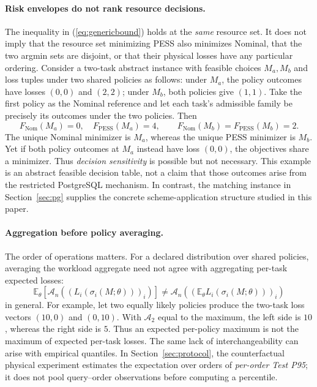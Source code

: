 \documentclass[sigconf, nonacm]{acmart}
\newcommand{\PESS}{\operatorname{PESS}}
\newcommand{\Nom}{\operatorname{Nom}}
\begin{document}
\paragraph{Risk envelopes do not rank resource decisions.}
The inequality in (\ref{eq:genericbound}) holds at the
\emph{same} resource set. It does not imply that the
resource set minimizing PESS also minimizes Nominal, that
the two argmin sets are disjoint, or that their physical
losses have any particular ordering. Consider a two-task
abstract instance with feasible choices $M_a,M_b$ and
loss tuples under two shared policies as follows:
under $M_a$, the policy outcomes have losses $(0,0)$
and $(2,2)$; under $M_b$, both policies give $(1,1)$.
Take the first policy as the Nominal reference and let
each task's admissible family be precisely its outcomes
under the two policies. Then
\[
F_{\Nom}(M_a)=0,\quad F_{\PESS}(M_a)=4,\qquad
F_{\Nom}(M_b)=F_{\PESS}(M_b)=2.
\]
The unique Nominal minimizer is $M_a$, whereas the
unique PESS minimizer is $M_b$. Yet if both policy
outcomes at $M_a$ instead have loss $(0,0)$, the
objectives share a minimizer. Thus \emph{decision
sensitivity} is possible but not necessary. This
example is an abstract feasible decision table, not
a claim that those outcomes arise from the restricted
PostgreSQL mechanism. In contrast, the matching
instance in Section~\ref{sec:pg} supplies the concrete
scheme-application structure studied in this paper.

\paragraph{Aggregation before policy averaging.}
The order of operations matters. For a declared distribution
over shared policies, averaging the workload aggregate
need not agree with aggregating per-task expected losses:
\[
\mathbb E_\theta[\mathcal A_n((L_i(\sigma_i(M;\theta)))_i)]
\ne
\mathcal A_n((\mathbb E_\theta L_i(\sigma_i(M;\theta)))_i)
\]
in general. For example, let two equally likely policies
produce the two-task loss vectors $(10,0)$ and $(0,10)$.
With $\mathcal A_2$ equal to the maximum, the left side
is $10$, whereas the right side is $5$. Thus an expected
per-policy maximum is not the maximum of expected
per-task losses. The same lack of interchangeability
can arise with empirical quantiles. In Section~\ref{sec:protocol},
the counterfactual physical experiment estimates the
expectation over orders of \emph{per-order Test P95};
it does not pool query--order observations before
computing a percentile.
\end{document}
